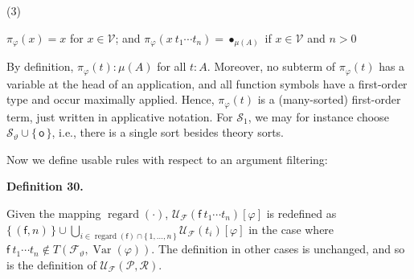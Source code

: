 \documentclass[10pt,a4paper]{amsart}
\begin{document}
 
 
\par\noindent  (3) 
 
$\pi_{\varphi}(x)=x$ for $x\in\mathcal{V}$; and $\pi_{\varphi}({x}\ {{t}_{1}\cdots{t}_{n}})=\bullet_{\mu(A)}$ if $x\in\mathcal{V}$ and $n>0$\par
 
 
  
 
 
 
By definition, $\pi_{\varphi}(t):\mu(A)$ for all $t:A$. Moreover, no subterm of $\pi_{\varphi}(t)$ has a variable at the head of an application, and all function symbols have a first-order type and occur maximally applied. Hence, $\pi_{\varphi}(t)$ is a (many-sorted) first-order term, just written in applicative notation. For $\mathcal{S}_{1}$, we may for instance choose ${\mathcal{S}}_{\vartheta}\cup\{\,\mathsf{o}\,\}$, i.e., there is a single sort besides theory sorts.\par
 
 
 
Now we define usable rules with respect to an argument filtering:\par
 
 
 
\par\medskip\noindent\textbf{Definition 30.}\par
 
 
Given the mapping $\operatorname{regard}(\cdot)$, $\mathcal{U}_{\mathcal{F}}({\mathsf{f}}\ {{t}_{1}\cdots{t}_{n}})[\varphi]$ is redefined as $\{\,(\mathsf{f},n)\,\}\cup\bigcup_{i\in\operatorname{regard}(\mathsf{f})\cap\{\,1,\ldots,n\,\}}\mathcal{U}_{\mathcal{F}}(t_{i})[\varphi]$ in the case where ${\mathsf{f}}\ {{t}_{1}\cdots{t}_{n}}\notin T({\mathcal{F}}_{\vartheta},\operatorname{Var}(\varphi))$. The definition in other cases is unchanged, and so is the definition of $\mathcal{U}_{\mathcal{F}}(\mathcal{P},\mathcal{R})$.\par
 
 
 
\end{document}
